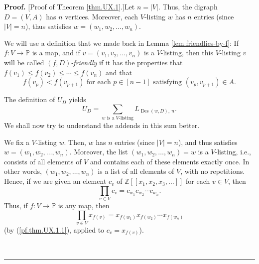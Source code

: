 \documentclass[numbers=enddot,12pt,final,onecolumn,notitlepage]{scrartcl}%
\numberwithin{exer}{section}
\theoremstyle{definition}
\newenvironment{proof}[1][Proof]{\noindent\textbf{#1.} }{\ \rule{0.5em}{0.5em}}
\let\sumnonlimits\sum
\let\prodnonlimits\prod
\renewcommand{\sum}{\sumnonlimits\limits}
\renewcommand{\prod}{\prodnonlimits\limits}
\begin{document}
\begin{proof}
[Proof of Theorem \ref{thm.UX.1}.]Let $n=\left\vert V\right\vert $. Thus, the
digraph $D=\left(  V,A\right)  $ has $n$ vertices. Moreover, each $V$-listing
$w$ has $n$ entries (since $\left\vert V\right\vert =n$), thus satisfies
$w=\left(  w_{1},w_{2},\ldots,w_{n}\right)  $.

We will use a definition that we made back in Lemma \ref{lem.friendlies-by-f}:
If $f:V\rightarrow\mathbb{P}$ is a map, and if $v=\left(  v_{1},v_{2}%
,\ldots,v_{n}\right)  $ is a $V$-listing, then this $V$-listing $v$ will be
called $\left(  f,D\right)  $\emph{-friendly} if it has the properties that
$f\left(  v_{1}\right)  \leq f\left(  v_{2}\right)  \leq\cdots\leq f\left(
v_{n}\right)  $ and that%
\[
f\left(  v_{p}\right)  <f\left(  v_{p+1}\right)  \text{ for each }p\in\left[
n-1\right]  \text{ satisfying }\left(  v_{p},v_{p+1}\right)  \in A.
\]


The definition of $U_{D}$ yields
\[
U_{D}=\sum_{w\text{ is a }V\text{-listing}}L_{\operatorname*{Des}\left(
w,D\right)  ,\ n}.
\]
We shall now try to understand the addends in this sum better.

We fix a $V$-listing $w$. Then, $w$ has $n$ entries (since $\left\vert
V\right\vert =n$), and thus satisfies $w=\left(  w_{1},w_{2},\ldots
,w_{n}\right)  $. Moreover, the list $\left(  w_{1},w_{2},\ldots,w_{n}\right)
=w$ is a $V$-listing, i.e., consists of all elements of $V$ and contains each
of these elements exactly once. In other words, $\left(  w_{1},w_{2}%
,\ldots,w_{n}\right)  $ is a list of all elements of $V$, with no repetitions.
Hence, if we are given an element $c_{v}$ of $\mathbb{Z}\left[  \left[
x_{1},x_{2},x_{3},\ldots\right]  \right]  $ for each $v\in V$, then%
\begin{equation}
\prod_{v\in V}c_{v}=c_{w_{1}}c_{w_{2}}\cdots c_{w_{n}}. \label{pf.thm.UX.1.1}%
\end{equation}
Thus, if $f:V\rightarrow\mathbb{P}$ is any map, then
\begin{equation}
\prod_{v\in V}x_{f\left(  v\right)  }=x_{f\left(  w_{1}\right)  }x_{f\left(
w_{2}\right)  }\cdots x_{f\left(  w_{n}\right)  } \label{pf.thm.UX.1.1f}%
\end{equation}
(by (\ref{pf.thm.UX.1.1}), applied to $c_{v}=x_{f\left(  v\right)  }$).


\end{proof}
\end{document}

